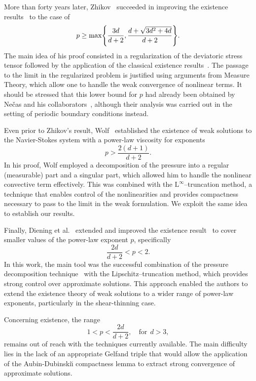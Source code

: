 \documentclass[12pt,reqno]{amsart}
\numberwithin{equation}{section}
\let\originalleft\left
\let\originalright\right
\renewcommand{\left}{\mathopen{}\mathclose\bgroup\originalleft}
\renewcommand{\right}{\aftergroup\egroup\originalright}
\theoremstyle{definition}
\def\L{\mathrm{L}}
\begin{document}
More than forty years later, {Zhikov}~\cite{Zhikov-2009} succeeded in improving the existence results~\cite{Lady-Steklov-1967,Lady-LOMI-1968,Lions:1969} to the case of
\begin{equation*}
p\geq \max\left\{\frac{3d}{d+2},\frac{d+\sqrt{3d^2+4d}}{d+2}\right\}.
\end{equation*}
The main idea of his proof consisted in a regularization of the deviatoric stress tensor followed by the application of the classical existence results~\cite{Lady-Steklov-1967,Lady-LOMI-1968,Lions:1969}.
The passage to the limit in the regularized problem is justified using arguments from Measure Theory, which allow one to handle the weak convergence of nonlinear terms.
It should be stressed that this lower bound for $p$ had already been obtained by {Ne\v{c}as and his collaborators}~\cite{Necas:book:1996}, although their analysis was carried out in the setting of periodic boundary conditions instead.

Even prior to Zhikov’s result, {Wolf}~\cite{Wolf:2007} established the existence of weak solutions to the Navier-Stokes system with a power-law viscosity for exponents
\begin{equation*}
p > \frac{2(d+1)}{d+2}.
\end{equation*}
In his proof, {Wolf} employed a decomposition of the pressure into a regular (measurable) part and a singular part, which allowed him to handle the nonlinear convective term effectively. This was combined with the $\L^\infty$--truncation method, a technique that enables control of the nonlinearities and provides compactness necessary to pass to the limit in the weak formulation. We exploit the same idea to establish our results.

Finally, {Diening et al.}~\cite{DRW} extended and improved the existence result~\cite{Wolf:2007} to cover smaller values of the power-law exponent $p$, specifically
\begin{equation*}
\frac{2d}{d+2} < p < 2.
\end{equation*}
In this work, the main tool was the successful combination of the pressure decomposition technique~\cite{Wolf:2007} with the Lipschitz--truncation method, which provides strong control over approximate solutions. This approach enabled the authors to extend the existence theory of weak solutions to a wider range of power-law exponents, particularly in the shear-thinning case.

Concerning existence, the range
\begin{equation*}
1 < p < \frac{2d}{d+2},\quad \mbox{for}\ \ d>3,
\end{equation*}
remains out of reach with the techniques currently available.
The main difficulty lies in the lack of an appropriate Gelfand triple that would allow the application of the Aubin-Dubinski\u{\i} compactness lemma to extract strong convergence of approximate solutions.
\end{document}

